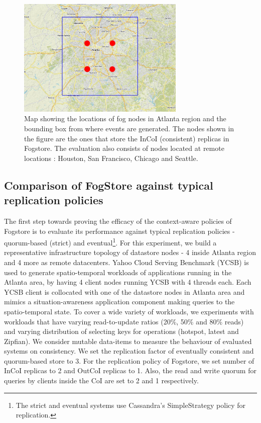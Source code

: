 \begin{figure}[h]
\centering
\includegraphics[width=8cm]{figures/fogstore/evals/hotspot/map-cropped.jpg}
\caption{Map showing the locations of fog nodes in Atlanta region and the bounding box from where events are generated. The nodes shown in the figure are the ones that store the InCoI (consistent) replicas in Fogstore. The evaluation also consists of nodes located at remote locations : Houston, San Francisco, Chicago and Seattle.}
\label{fig:hotspotmap}
\end{figure}

\subsection{Comparison of FogStore against typical replication policies}
The first step towards proving the efficacy of the context-aware policies of Fogstore is to evaluate its performance against typical replication policies - quorum-based (strict) and eventual\footnote{The strict and eventual systems use Cassandra's SimpleStrategy policy for replication.}. 
For this experiment, we build a representative infrastructure topology of datastore nodes - 4 inside Atlanta region and 4 more as remote datacenters. Yahoo Cloud Serving Benchmark (YCSB) is used to generate spatio-temporal workloads of applications running in the Atlanta area, by having 4 client nodes running YCSB with 4 threads each. Each YCSB client is collocated with one of the datastore nodes in Atlanta area and mimics a situation-awareness application component making queries to the spatio-temporal state. To cover a wide variety of workloads, we experiments with workloads that have varying read-to-update ratios (20\%, 50\% and 80\% reads) and varying distribution of selecting keys for operations (hotspot, latest and Zipfian). We consider mutable data-items to measure the behaviour of evaluated systems on consistency. We set the replication factor of eventually consistent and quorum-based store to 3. For the replication policy of Fogstore, we set number of InCoI replicas to 2 and OutCoI replicas to 1. Also, the read and write quorum for queries by clients inside the CoI are set to 2 and 1 respectively. 

